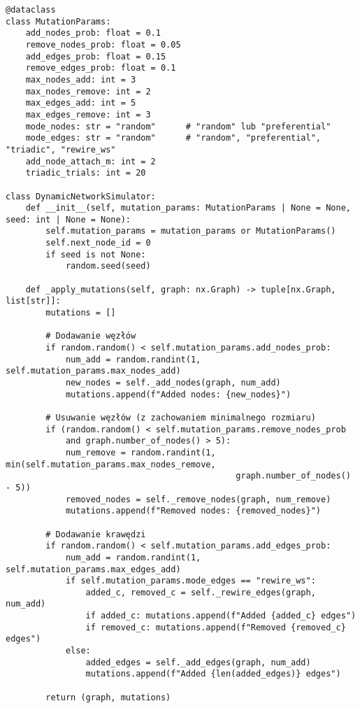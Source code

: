     {\footnotesize
        \begin{verbatim}
@dataclass
class MutationParams:
    add_nodes_prob: float = 0.1
    remove_nodes_prob: float = 0.05
    add_edges_prob: float = 0.15
    remove_edges_prob: float = 0.1
    max_nodes_add: int = 3
    max_nodes_remove: int = 2
    max_edges_add: int = 5
    max_edges_remove: int = 3
    mode_nodes: str = "random"      # "random" lub "preferential"
    mode_edges: str = "random"      # "random", "preferential", "triadic", "rewire_ws"
    add_node_attach_m: int = 2
    triadic_trials: int = 20

class DynamicNetworkSimulator:
    def __init__(self, mutation_params: MutationParams | None = None, seed: int | None = None):
        self.mutation_params = mutation_params or MutationParams()
        self.next_node_id = 0
        if seed is not None:
            random.seed(seed)

    def _apply_mutations(self, graph: nx.Graph) -> tuple[nx.Graph, list[str]]:
        mutations = []

        # Dodawanie węzłów
        if random.random() < self.mutation_params.add_nodes_prob:
            num_add = random.randint(1, self.mutation_params.max_nodes_add)
            new_nodes = self._add_nodes(graph, num_add)
            mutations.append(f"Added nodes: {new_nodes}")

        # Usuwanie węzłów (z zachowaniem minimalnego rozmiaru)
        if (random.random() < self.mutation_params.remove_nodes_prob
            and graph.number_of_nodes() > 5):
            num_remove = random.randint(1, min(self.mutation_params.max_nodes_remove,
                                              graph.number_of_nodes() - 5))
            removed_nodes = self._remove_nodes(graph, num_remove)
            mutations.append(f"Removed nodes: {removed_nodes}")

        # Dodawanie krawędzi
        if random.random() < self.mutation_params.add_edges_prob:
            num_add = random.randint(1, self.mutation_params.max_edges_add)
            if self.mutation_params.mode_edges == "rewire_ws":
                added_c, removed_c = self._rewire_edges(graph, num_add)
                if added_c: mutations.append(f"Added {added_c} edges")
                if removed_c: mutations.append(f"Removed {removed_c} edges")
            else:
                added_edges = self._add_edges(graph, num_add)
                mutations.append(f"Added {len(added_edges)} edges")

        return (graph, mutations)


\end{verbatim}}
